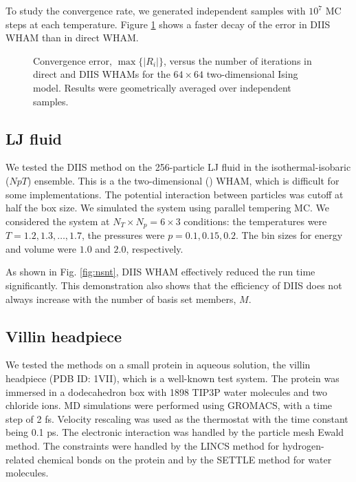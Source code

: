 \documentclass[reprint,aip,jcp,superscriptaddress]{revtex4-1}
\begin{document}
To study the convergence rate,
we generated independent samples with
$10^7$ MC steps at each temperature.
%
Figure \ref{fig:is2trace}
shows a faster decay of the error
in DIIS WHAM
than in direct WHAM.






\begin{figure}[h]
  \caption{
    \label{fig:is2trace}
    Convergence error, $\max \{ |R_i| \}$,
    versus the number of iterations
    in direct and DIIS WHAMs
    for the $64\times64$ two-dimensional Ising model.
    Results were geometrically averaged over independent samples.
  }
\end{figure}




\subsection{\label{sec:results_LJ}
LJ fluid}


We tested the DIIS method
on the 256-particle LJ fluid in the isothermal-isobaric ($NpT$) ensemble.
%
This is a the two-dimensional () WHAM,
which is difficult for some implementations.
%
The potential interaction between particles was cutoff at half the box size.
%
We simulated the system 
using parallel tempering MC.
%
We considered the system
at $N_T \times N_p = 6\times 3$ conditions:
the temperatures were $T = 1.2, 1.3, \dots, 1.7$,
the pressures were $p = 0.1, 0.15, 0.2$.
%
The bin sizes for energy and volume
were $1.0$ and $2.0$, respectively.



As shown in Fig. \ref{fig:nsnt},
DIIS WHAM effectively
reduced the run time significantly.
%
This demonstration also shows that
the efficiency of DIIS does not
always increase with
the number of basis set members, $M$.




\subsection{\label{sec:results_villin}
Villin headpiece}



We tested the methods on a small protein in aqueous solution,
the villin headpiece
(PDB ID: 1VII), which is a well-known test system\cite{duan1998}.
%
The protein was immersed in
a dodecahedron box with 1898 TIP3P water molecules and two chloride ions.
%
MD simulations were performed
using GROMACS\cite{
berendsen1995, *lindahl2001, *vanderspoel2005, *hess2008},
with a time step of 2 fs.
%
Velocity rescaling\cite{bussi2007}
was used as the thermostat with
the time constant being 0.1 ps.
%
The electronic interaction was
handled by the particle mesh Ewald method\cite{
essmann1995}.
%
The constraints were handled by the LINCS method\cite{
hess1997}
for hydrogen-related chemical bonds on the protein
and by the SETTLE method\cite{
miyamoto1992}
for water molecules.
%
\end{document}
